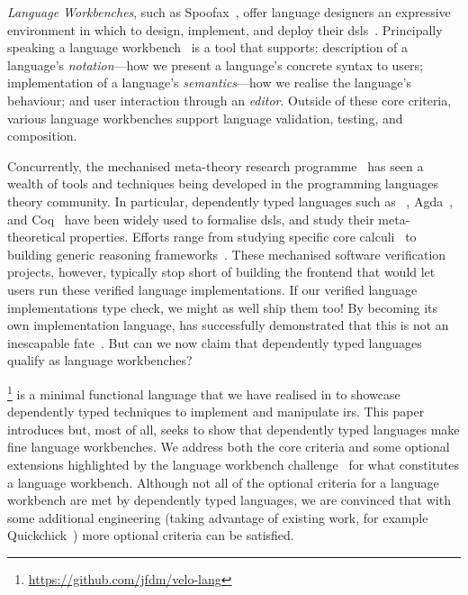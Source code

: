 \emph{Language Workbenches}, such as
Spoofax~\cite{DBLP:journals/software/WachsmuthKV14},
offer language designers an expressive environment in which to design,
implement, and deploy their \Acp{dsl}~\cite{hudak1996building}.
%
Principally speaking a language workbench~\cite{DBLP:conf/sle/ErdwegSVBBCGHKLKMPPSSSVVVWW13}
is a tool that supports:
description of a language's \emph{notation}---how we present a language's concrete syntax to users;
implementation of a language's \emph{semantics}---how we realise the language's behaviour;
and user interaction through an \emph{editor}.
%
Outside of these core criteria, various language workbenches
support language validation, testing, and composition.


Concurrently, the mechanised meta-theory research
programme~\cite{DBLP:conf/tphol/AydemirBFFPSVWWZ05,DBLP:journals/jfp/AbelAHPMSS19}
has seen a wealth of tools and techniques being developed
in the programming languages theory community.
%
In particular, dependently typed languages such as
\Idris{}~\cite{DBLP:conf/ecoop/Brady21},
Agda~\cite{DBLP:conf/afp/Norell08},
and Coq~\cite{the_coq_development_team_2022_5846982}
have been widely used to formalise \acp{dsl}, and study their
meta-theoretical properties.
%
Efforts range from
studying specific core calculi~\cite{10.1145/3093333.3009866,DBLP:conf/cpp/RouvoetPKV20,DBLP:conf/mpc/ChapmanKNW19}
to building generic reasoning frameworks~\cite{DBLP:conf/cpp/StarkSK19,DBLP:journals/jfp/AllaisACMM21}.
%
These mechanised software verification projects, however, typically stop short
of building the frontend that would let users run these verified
language implementations.
If our verified language implementations type check, we might as well ship them too!
%
By becoming its own implementation language, \Idris{} has successfully
demonstrated that this is not an inescapable fate~\cite{DBLP:conf/ecoop/Brady21}.
%
But can we now claim that dependently typed languages qualify as
language workbenches?

\Velo{}\footnote{\url{https://github.com/jfdm/velo-lang}} is a minimal functional language that we have realised in \Idris{}
to showcase dependently typed techniques to implement and manipulate \acp{ir}.
%
This paper introduces \Velo{} but, most of all, seeks to show that
dependently typed languages make fine language workbenches.
%
We address both the core criteria and some optional extensions
highlighted by the language workbench challenge~\cite{DBLP:conf/sle/ErdwegSVBBCGHKLKMPPSSSVVVWW13} for what constitutes a language workbench.
%
%
Although not all of the optional criteria for a language workbench are met by dependently typed languages, we are convinced that with some additional engineering (taking advantage of existing work, for example Quickchick~\cite{DBLP:journals/pacmpl/LampropoulosPP18}) more optional criteria can be satisfied.


